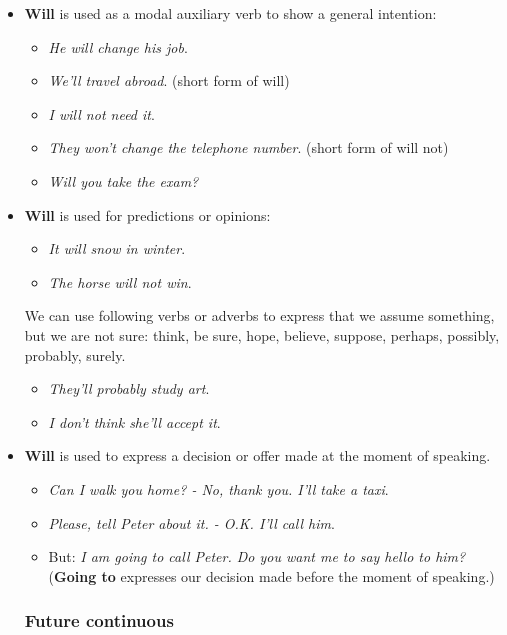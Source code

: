 \begin{itemize}

\item \textbf{Will} is used as a modal auxiliary verb to show a general intention:
\begin{itemize}

\item \textit{He will change his job}.
\item \textit{We'll travel abroad}. (short form of will) 
\item \textit{I will not need it}.
\item \textit{They won't change the telephone number}. (short form of will not)
\item \textit{Will you take the exam?}

\end{itemize} 

\item \textbf{Will} is used for predictions or opinions: 

\begin{itemize}
\item \textit{It will snow in winter}.
\item \textit{The horse will not win}.
\end{itemize}

We can use following verbs or adverbs to express that we assume something, but we are not sure: think, be sure, hope, believe, suppose, perhaps, possibly, probably, surely. 

\begin{itemize}
\item \textit{They'll probably study art}.
\item \textit{I don't think she'll accept it}.
\end{itemize}

\item \textbf{Will} is used to express a decision or offer made at the moment of speaking.
\begin{itemize}
\item \textit{Can I walk you home? - No, thank you. I'll take a taxi}.
\item \textit{Please, tell Peter about it. - O.K. I'll call him}.
\item But: \textit{I am going to call Peter. Do you want me to say hello to him?} (\textbf{Going to} expresses our decision made before the moment of speaking.) 
\end{itemize}

\subsubsection{Future continuous}


\end{itemize}
